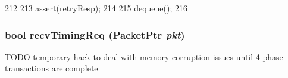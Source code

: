 \begin{DoxyCode}
212 {
213     assert(retryResp);
214 
215     dequeue();
216 }
\end{DoxyCode}
\hypertarget{classSimpleMemory_a3344d9dd0f83257feab5424e761f31c6}{
\subsubsection[{recvTimingReq}]{\setlength{\rightskip}{0pt plus 5cm}bool recvTimingReq ({\bf PacketPtr} {\em pkt})}}
\label{classSimpleMemory_a3344d9dd0f83257feab5424e761f31c6}


\begin{Desc}
\item[\hyperlink{todo__todo000086}{TODO}]temporary hack to deal with memory corruption issues until 4-\/phase transactions are complete \end{Desc}



